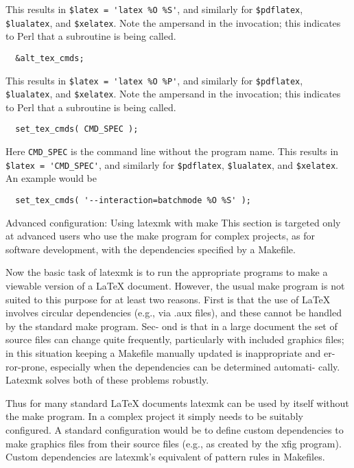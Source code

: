 This results in \verb|$latex = 'latex %O %S'|, and  similarly  for  \verb|$pdflatex|,
\verb|$lualatex|,  and  \verb|$xelatex|.   Note the ampersand in the invocation; this
indicates to Perl that a subroutine is being called.

\begin{verbatim}
  &alt_tex_cmds;
\end{verbatim}

This results in \verb|$latex = 'latex %O %P'|, and  similarly  for
\verb|$pdflatex|, \verb|$lualatex|,  and  \verb|$xelatex|.   Note the ampersand
in the invocation; this indicates to Perl that a subroutine is being called.

\begin{verbatim}
  set_tex_cmds( CMD_SPEC );
\end{verbatim}

Here \verb|CMD_SPEC| is the command line without the program  name.  This  results in
\verb|$latex = 'CMD_SPEC'|, and similarly for \verb|$pdflatex|,
\verb|$lualatex|, and \verb|$xelatex|.
An example would be

\begin{verbatim}
  set_tex_cmds( '--interaction=batchmode %O %S' );
\end{verbatim}


Advanced configuration: Using latexmk with make This section is targeted only
at advanced users who use the  make  program for complex projects, as for
software development, with the dependencies specified by a Makefile.

Now the basic task of latexmk is to run  the  appropriate  programs  to make  a
viewable version of a LaTeX document.  However, the usual make program is not
suited to this purpose for at least two reasons.   First is that the use of
LaTeX involves circular dependencies (e.g., via .aux files), and these cannot
be handled by the standard make program.  Sec- ond  is  that  in  a  large
document the set of source files can change quite frequently, particularly with
included graphics  files;  in  this situation  keeping a Makefile manually
updated is inappropriate and er- ror-prone, especially when the dependencies
can be determined automati- cally.  Latexmk solves both of these problems
robustly.

Thus  for  many  standard LaTeX documents latexmk can be used by itself without
the make program. In a complex project it simply needs  to  be suitably
configured.  A standard configuration would be to define custom dependencies to
make graphics files from their source files  (e.g., as  created  by  the  xfig
program).  Custom dependencies are latexmk's equivalent of pattern rules in
Makefiles.

